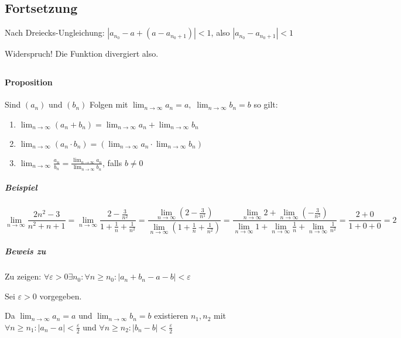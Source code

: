 \documentclass[14pt,a4paper]{article}
\begin{document}
    \subsection*{Fortsetzung}
    Nach Dreiecks-Ungleichung: $ | a_{n_0} - a + (a - a_{n_0 + 1}) | < 1 $, also
    $ | a_{n_0} - a_{n_0 + 1} | < 1 $

    Widerspruch! Die Funktion divergiert also.

    \subsection{}
    \paragraph{Proposition}
    Sind $(a_n)$ und $(b_n)$ Folgen mit $ \lim_{n \to \infty}a_n = a,\; \lim_{n
      \to \infty}b_n = b $ so gilt:

    \begin{enumerate}
      \item $ \lim_{n\to\infty}(a_n + b_n) = \lim_{n \to\infty} a_n +
        \lim_{n\to\infty} b_n $
      \item $ \lim_{n\to\infty} (a_n \cdot b_n) = ( \lim_{n \to\infty} a_n \cdot
          \lim_{n\to\infty} b_n ) $
      \item $ \lim_{n\to\infty} \frac{a_n}{b_n} = \frac{\lim_{n\to\infty}
          a_n}{\lim_{n\to\infty} b_n}$, falls $ b \neq 0$
    \end{enumerate}

    \subparagraph{Beispiel}
    $$ \lim_{n\to\infty} \frac{2n^2-3}{n^2+n+1} = \lim_{n\to\infty}
    \frac{2 - \frac{3}{n^2}}{1 + \frac{1}{n} + \frac{1}{n^2}} = \frac{
      \lim_{n\to\infty} (2 - \frac{3}{n^1})}{ \lim_{n\to\infty} (1 + \frac{1}{n}
      + \frac{1}{n^2}) } = \frac{\lim_{n\to\infty} 2 + \lim_{n\to\infty} (-
      \frac{3}{n^2})}{\lim_{n\to\infty} 1 + \lim_{n\to\infty} \frac{1}{n} +
      \lim_{n\to\infty} \frac{1}{n^2}} = \frac{2 + 0}{1 + 0 + 0} = 2$$


    \subparagraph{Beweis zu }
    Zu zeigen: $ \forall \varepsilon > 0 \exists n_0 : \forall n \geq n_0 : |a_n
    + b_n - a - b| < \varepsilon $

    Sei $\varepsilon > 0 $ vorgegeben.

    Da $ \lim_{n\to\infty} a_n = a $ und $\lim_{n\to\infty} b_n = b$ existieren
    $n_1, n_2$ mit $ \forall n \geq n_1 : | a_n - a | < \frac{\varepsilon}{2} $
    und $ \forall n \geq n_2 : | b_n - b | < \frac{\varepsilon}{2} $
\end{document}
